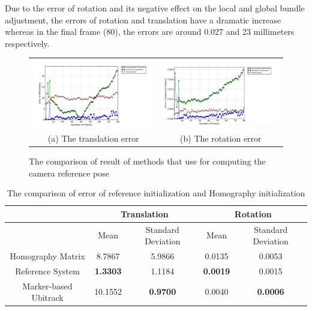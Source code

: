 Due to the error of rotation and its negative effect on the local and global bundle adjustment, the errors of rotation and translation have a dramatic increase whereas in the final frame (80), the errors are around 0.027 and 23 millimeters respectively. 

\begin{figure}[H]
\begin{tabular}{cc}
  \includegraphics[width=80mm]{figures/homo/graph_translation} &  \includegraphics[width=80mm]{figures/homo/graph_rotation} \\
	(a) The translation error & (b) The rotation error \\[6pt]
\end{tabular}
\caption{The comparison of result of methods that use for computing the camera reference pose }\label{fig:initial_pose}
\end{figure}

\begin{table}[H]
\centering
  \begin{tabular}{| c || c | c | c | c |}
      \hline
       & \multicolumn{2}{c|}{Translation} & \multicolumn{2}{c|}{Rotation} \\ \hline
       & Mean & Standard Deviation & Mean & Standard Deviation \\ \hline
      Homography Matrix & 8.7867 & 5.9866 & 0.0135 & 0.0053 \\ \hline
      Reference System & \textbf{1.3303} & 1.1184 & \textbf{0.0019} & 0.0015 \\ \hline
      Marker-based Ubitrack & 10.1552 & \textbf{0.9700} & 0.0040 & \textbf{0.0006} \\ \hline
  \end{tabular}
  \caption{The comparison of error of reference initialization and Homography initialization} \label{tab:initial_pose}
\end{table}


